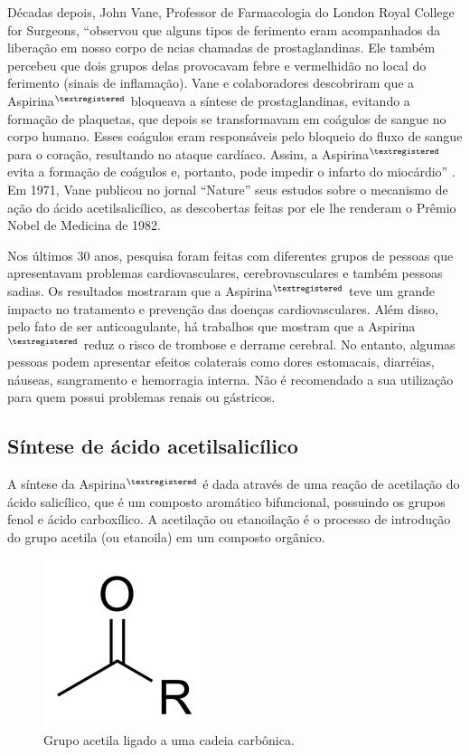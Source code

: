 Décadas depois, John Vane, Professor de Farmacologia do London Royal College for Surgeons, “observou que
alguns tipos de ferimento eram acompanhados da liberação em nosso corpo de ncias chamadas de
prostaglandinas. Ele também percebeu que dois grupos delas provocavam febre e vermelhidão no local do
ferimento (sinais de inflamação). Vane e colaboradores descobriram que a
Aspirina$^{\tiny{\textregistered}}$ bloqueava a síntese de prostaglandinas, evitando a formação de
plaquetas, que depois se transformavam em coágulos de sangue no corpo humano. Esses coágulos eram
responsáveis pelo bloqueio do fluxo de sangue para o coração, resultando no ataque cardíaco. Assim, a
Aspirina$^{\tiny{\textregistered}}$ evita a formação de coágulos e, portanto, pode impedir o infarto do
miocárdio” \cite{massabni2006}. Em 1971, Vane publicou no jornal “Nature” seus estudos sobre o mecanismo de
ação do ácido acetilsalicílico, as descobertas feitas por ele lhe renderam o Prêmio Nobel de Medicina de
1982. 

Nos últimos 30 anos, pesquisa foram feitas com diferentes grupos de pessoas que apresentavam problemas
cardiovasculares, cerebrovasculares e também pessoas sadias. Os resultados mostraram que a
Aspirina$^{\tiny{\textregistered}}$ teve um grande impacto no tratamento e prevenção das doenças
cardiovasculares.  Além disso, pelo fato de ser anticoagulante, há trabalhos que mostram que a
Aspirina$^{\tiny{\textregistered}}$ reduz o risco de trombose e derrame cerebral. No entanto, algumas
pessoas podem apresentar efeitos colaterais como dores estomacais, diarréias, náuseas, sangramento e
hemorragia interna. Não é recomendado a sua utilização para quem possui problemas renais ou gástricos.

\subsection{Síntese de ácido acetilsalicílico}

A síntese da Aspirina$^{\tiny{\textregistered}}$ é dada através de uma reação de acetilação do ácido
salicílico, que é um composto aromático bifuncional, possuindo os grupos fenol e ácido carboxílico. A
acetilação ou etanoilação é o processo de introdução do grupo acetila (ou etanoila) em um composto
orgânico.

\begin{figure}[H]
\begin{center}
    \includegraphics[width=.4\textwidth]{figuras/im1.png}
\end{center}
\caption{Grupo acetila ligado a uma cadeia carbônica.}\label{fig:im1}
\end{figure}

